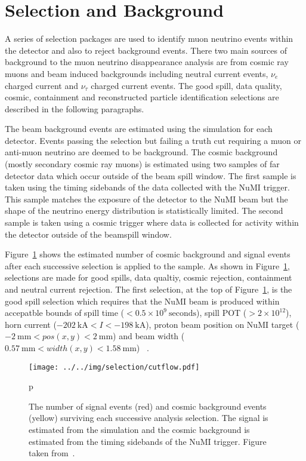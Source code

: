\section{Selection and Background}\label{sec:sel}

A series of selection packages are used to identify muon neutrino
events within the detector and also to reject background events.
There two main sources of background to the muon neutrino
disappearance analysis are from cosmic ray muons and beam induced
backgrounds including neutral current events, $\nu_e$ charged current
and $\nu_\tau$ charged current events. 
The good spill, data quality, cosmic, containment and reconstructed
particle identification selections are described in the following
paragraphs. 
  

The beam background events are estimated using the simulation for each
detector.
Events passing the selection but failing a truth cut
requiring a muon or anti-muon neutrino are deemed to be
background. 
The cosmic background (mostly secondary cosmic ray muons) is estimated
using two samples of far detector data which occur outside of the beam
spill window.  
The first sample is taken using the timing sidebands of the data
collected with the NuMI trigger. This sample matches the exposure of the
detector to the NuMI beam but the shape of the neutrino energy
distribution is statistically limited.
The second sample is taken using a cosmic trigger where data is
collected for activity within the detector outside of the beamspill window.

Figure~\ref{fig:cosCutFlow} shows the estimated number of cosmic
background and signal events after each successive selection is
applied to the sample.
As shown in Figure~\ref{fig:cosCutFlow}, selections are made for good
spills, data qualtiy, cosmic rejection, containment and neutral
current rejection. 
The first selection, at the top of Figure~\ref{fig:cosCutFlow}, is the
good spill selection which requires that the
NuMI beam is produced within accepatble bounds of spill time ($< 0.5
\times 10^9~\text{seconds}$), 
spill POT ($> 2 \times 10^{12}$), 
horn current ($-202~\text{kA} < I < -198~\text{kA}$), proton beam
position on NuMI target ($-2~\text{mm} < pos(x,y) < 2~\text{mm}$) and
beam width ($0.57~\text{mm} < width(x,y) <1.58~\text{mm}$)
\cite{NOvASADAQ}~\cite{NOvAFABeamMon}. 

\begin{figure}
  \centering
  \texttt{[image: ../../img/selection/cutflow.pdf]}
  \caption{The number of signal events (red) and cosmic background
    events (yellow) surviving each successive analysis selection. The
    signal is estimated from the simulation and the cosmic background
    is estimated from the timing sidebands of the NuMI trigger. Figure
    taken from~\cite{NOvANumuSABless}.
  } 
  \label{fig:cosCutFlow}
p\end{figure}


